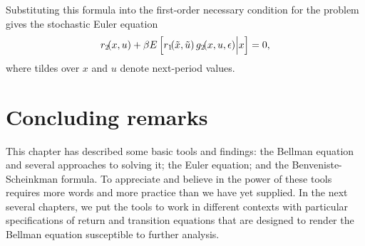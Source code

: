 Substituting this formula into the first-order necessary condition for the
problem gives the stochastic Euler equation
$$r_2\!(x,u)+{\beta} E \left[ r_1\!(\tilde x,\tilde u) \, g_2\!(x,u,{\epsilon}) \Big| x\right] =0,$$
where tildes over $x$ and $u$ denote next-period values.




\section{Concluding remarks}
This chapter has described some basic tools and findings: the Bellman
equation and several approaches to solving it; the Euler equation;
and the Benveniste-Scheinkman formula.
To appreciate and believe in  the power of these tools requires more
words and
more  practice than we have yet supplied.
In the next several chapters, we put the  tools to work
in different contexts  with particular specifications
of return  and transition equations that are designed to render
the Bellman equation susceptible to further analysis.



